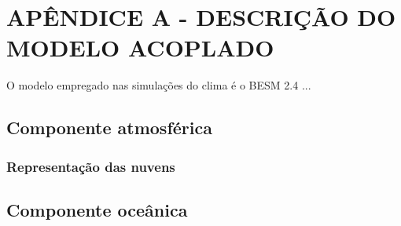 \hypertarget{estilo:apendice1}{} %
\renewcommand{\thechapter}{}%
\chapter{APÊNDICE A - DESCRIÇÃO DO MODELO ACOPLADO}	%
\label{apendiceA}	%
\renewcommand{\thechapter}{A}%

O modelo empregado nas simulações do clima é o BESM 2.4 ...


\section{Componente atmosférica}


\subsection{Representação das nuvens} 


\section{Componente oceânica}

